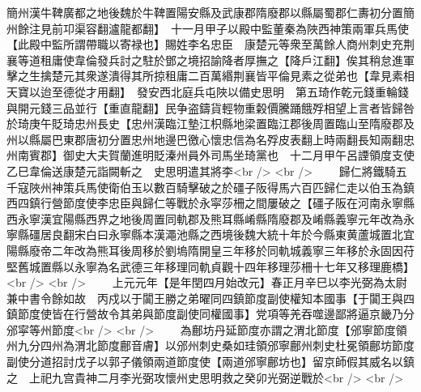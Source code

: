 簡州漢牛鞞廣都之地後魏於牛鞞置陽安縣及武康郡隋廢郡以縣屬蜀郡仁夀初分置簡州餘注見前卭渠容翻瀘龍都翻】　十一月甲子以殿中監董秦為陜西神策兩軍兵馬使【此殿中監所謂帶職以寄禄也】賜姓李名忠臣　康楚元等衆至萬餘人商州刺史充荆襄等道租庸使韋倫發兵討之駐於鄧之境招諭降者厚撫之【降戶江翻】俟其稍怠進軍擊之生擒楚元其衆遂潰得其所掠租庸二百萬緡荆襄皆平倫見素之從弟也【韋見素相天寶以迨至德從才用翻】　發安西北庭兵屯陜以備史思明　第五琦作乾元錢重輪錢與開元錢三品並行【重直龍翻】民争盗鑄貨輕物重糓價騰踊餓殍相望上言者皆歸咎於琦庚午貶琦忠州長史【忠州漢臨江墊江枳縣地梁置臨江郡後周置臨山至隋廢郡及州以縣屬巴東郡唐初分置忠州地邊巴徼心懷忠信為名殍皮表翻上時兩翻長知兩翻忠州南賓郡】御史大夫賀蘭進明貶溱州員外司馬坐琦黨也　十二月甲午呂諲領度支使乙巳韋倫送康楚元詣闕斬之　史思明遣其將李<br />
<br />
　　歸仁將鐵騎五千寇陜州神策兵馬使衛伯玉以數百騎擊破之於礓子阪得馬六百匹歸仁走以伯玉為鎮西四鎮行營節度使李忠臣與歸仁等戰於永寜莎柵之間屢破之【礓子阪在河南永寧縣西永寧漢宜陽縣西界之地後周置同軌郡及熊耳縣崤縣隋廢郡及崤縣義寧元年改為永寧縣礓居良翻宋白曰永寧縣本漢澠池縣之西境後魏大統十年於今縣東黄蘆城置北宜陽縣廢帝二年改為熊耳後周移於劉塢隋開皇三年移於同軌城義寧三年移於永固因苻堅舊城置縣以永寧為名武德三年移理同軌貞觀十四年移理莎柵十七年又移理鹿橋】<br />
<br />
　　上元元年【是年閏四月始改元】春正月辛巳以李光弼為太尉兼中書令餘如故　丙戍以于闐王勝之弟曜同四鎮節度副使權知本國事【于闐王與四鎮節度使皆在行營故令其弟與節度副使同權國事】党項等羌吞噬邊鄙將逼京畿乃分邠寜等州節度<br />
<br />
　　為鄜坊丹延節度亦謂之渭北節度【邠寧節度領州九分四州為渭北節度鄜音膚】以邠州刺史桑如珪領邠寧鄜州刺史杜冕領鄜坊節度副使分道招討戊子以郭子儀領兩道節度使【兩道邠寧鄜坊也】留京師假其威名以鎮之　上祀九宫貴神二月李光弼攻懷州史思明救之癸卯光弼逆戰於<br />
<br />
